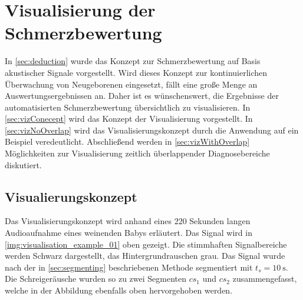 \chapter{Visualisierung der Schmerzbewertung}
\label{sec:visualisation}

In \autoref{sec:deduction} wurde das Konzept zur Schmerzbewertung auf Basis akustischer Signale vorgestellt. Wird dieses Konzept zur kontinuierlichen Überwachung von Neugeborenen eingesetzt, fällt eine große Menge an Auswertungsergebnissen an. Daher ist es wünschenswert, die Ergebnisse der automatisierten Schmerzbewertung übersichtlich zu visualisieren. In \autoref{sec:vizConecept} wird das Konzept der Visualisierung vorgestellt. In \autoref{sec:vizNoOverlap} wird das Visualisierungskonzept durch die Anwendung auf ein Beispiel veredeutlicht. Abschließend werden in \autoref{sec:vizWithOverlap} Möglichkeiten zur Visualisierung zeitlich überlappender Diagnosebereiche diskutiert.

\section{Visualierungskonzept}
\label{sec:vizConecept}

Das Visualisierungskonzept wird anhand eines 220 Sekunden langen Audioaufnahme eines weinenden Babys erläutert. Das Signal wird in \autoref{img:visualisation_example_01} oben gezeigt. Die stimmhaften Signalbereiche werden Schwarz dargestellt, das Hintergrundrauschen grau. Das Signal wurde nach der in \autoref{sec:segmenting} beschriebenen Methode segmentiert mit $t_{s} = \SI{10}{\second}$. Die Schreigeräusche wurden so zu zwei Segmenten $cs_1$ und $cs_2$ zusammengefasst, welche in der Abbildung ebenfalls oben hervorgehoben werden.

